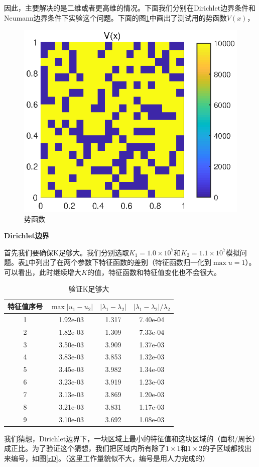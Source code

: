 \documentclass[12pt,a4paper]{article}
\begin{document}
因此，主要解决的是二维或者更高维的情况。下面我们分别在Dirichlet边界条件和Neumann边界条件下实验这个问题。下面的图\ref{V}中画出了测试用的势函数$V(x)$，
\begin{figure}[htbp]
\centering
\includegraphics[width=0.4\linewidth]{pics/V}
\caption{势函数}
\label{V}
\end{figure}

\textbf{Dirichlet边界}

首先我们要确保K足够大。我们分别选取$K_1=1.0 \times 10^7$和$K_2=1.1 \times 10^7$模拟问题。表\ref{kD}中列出了在两个参数下特征函数的差别（特征函数归一化到$\max u = 1$）。可以看出，此时继续增大$K$的值，特征函数和特征值变化也不会很大。

\begin{table}
\centering
\begin{tabular}{c|c|c|c}
\hline
特征值序号 & $\max |u_1 - u_2|$ & $|\lambda_1 - \lambda_2|$ & $|\lambda_1 - \lambda_2| / \lambda_2$ \\
\hline
1 & 1.92e-03 & 1.317 & 7.40e-04 \\
2 & 1.82e-03 & 1.309 & 7.33e-04 \\
3 & 3.50e-03 & 3.909 & 1.37e-03 \\
4 & 3.83e-03 & 3.853 & 1.32e-03 \\
5 & 3.45e-03 & 3.982 & 1.34e-03 \\
6 & 3.23e-03 & 3.919 & 1.23e-03 \\
7 & 3.13e-03 & 3.869 & 1.20e-03 \\
8 & 3.21e-03 & 3.831 & 1.17e-03 \\
9 & 3.10e-03 & 3.692 & 1.08e-03 \\
\hline 
\end{tabular}
\caption{验证K足够大}
\label{kD}
\end{table}

我们猜想，Dirichlet边界下，一块区域上最小的特征值和这块区域的（面积/周长）成正比。为了验证这个猜想，我们把区域内所有除了$1\times1$和$1\times2$的子区域都找出来编号，如图\ref{rD}。（这里工作量貌似不大，编号是用人力完成的）
\end{document}
